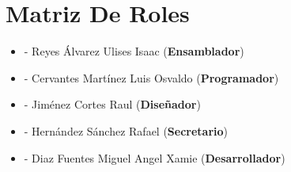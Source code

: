 \documentclass[11pt,a4paper]{article}
\begin{document}
 \pagebreak
 \section{Matriz De Roles}
 
 \begin{itemize}
 \item - Reyes Álvarez Ulises Isaac (\textbf{Ensamblador})\\
 \item - Cervantes Martínez Luis Osvaldo (\textbf{Programador})\\
 \item - Jiménez Cortes Raul (\textbf{Diseñador})\\
 \item - Hernández Sánchez Rafael (\textbf{Secretario})\\
 \item - Diaz Fuentes Miguel Angel Xamie (\textbf{Desarrollador})\\ 
 \end{itemize}
 
\end{document}
